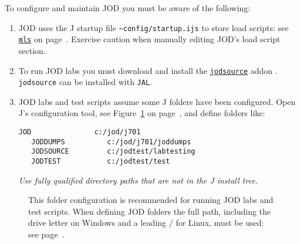 To configure and maintain JOD you must be aware of the following:
\begin{enumerate}
	\item JOD uses the J startup file \verb|~config/startup.ijs| to store load scripts: see 
	\hyperlink{il:mls}{\texttt{mls}} on page~\pageref{ss:mls}.  Exercise caution when manually
	editing JOD's load script section.
	\item To run JOD labs you must download and install the
	 \href{http://www.jsoftware.com/jwiki/Addons/general/jodsource}{\texttt{jodsource}} addon \cite{baker:jodsource}. 
	 \texttt{jodsource} can be installed with \texttt{JAL}.
	\item JOD labs and test scripts assume some J folders have been configured.  Open J's
	configuration tool, see Figure~\ref{eps:jodfolders} on 
   page~\pageref{eps:jodfolders}, and
	define folders like:
	\begin{lstlisting}[frame=single,framerule=0pt,label=lst:foldercfg]
   JOD               c:/jod/j701
   JODDUMPS          c:/jod/j701/joddumps
   JODSOURCE         c:/jodtest/labtesting
   JODTEST           c:/jodtest/test
  \end{lstlisting}
  \emph{Use fully qualified directory paths that are not in the J install tree.}
\end{enumerate} 



\begin{figure}[htbp]
  \centering
  \hfill
\caption[JOD Folders]{This folder configuration is recommended for running JOD labs and test scripts. When defining JOD folders the full path, including the drive letter on Windows and a
leading / for Linux, must be used: see page~\pageref{lst:foldercfg}.} 
  \label{eps:jodfolders}
\end{figure}
